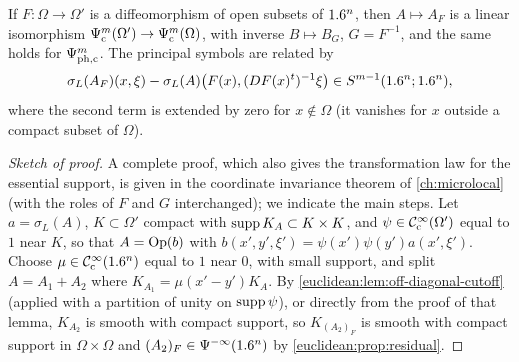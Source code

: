 \begin{proposition}\label{euclidean:prop:coordinates}
  If $F:\Omega\to\Omega'$ is a diffeomorphism of open subsets of $1.6^n$,
  then $A\mapsto A_F$ is a linear isomorphism
  $\Psi^{m}_{\mathrm c}(\Omega')\to\Psi^{m}_{\mathrm c}(\Omega)$, with inverse
  $B\mapsto B_G$, $G=F^{-1}$, and the same holds for
  $\Psi^{m}_{\mathrm{ph,c}}$. The principal symbols are related by
  \begin{equation*}
    \sigma_L(A_F)(x,\xi)-\sigma_L(A)\bigl(F(x),(DF(x)^t)^{-1}\xi\bigr)\in S^{m-1}(1.6^n;1.6^n),
  \end{equation*}
  where the second term is extended by zero for $x\notin\Omega$ \textup{(}it
  vanishes for $x$ outside a compact subset of $\Omega$\textup{)}.
\end{proposition}
\begin{proof}[Sketch of proof]
  A complete proof, which also gives the transformation law for the
  essential support, is given in the coordinate invariance theorem of
  \cref{ch:microlocal} (with the roles of $F$ and $G$ interchanged); we
  indicate the main steps. Let $a=\sigma_L(A)$, $K\subset\Omega'$ compact
  with $\operatorname{supp} K_A\subset K\times K$, and $\psi\in\mathcal{C}^\infty_{\mathrm{c}}(\Omega')$ equal to $1$
  near $K$, so that $A=\operatorname{Op}(b)$ with $b(x',y',\xi')=\psi(x')\psi(y')a(x',\xi')$.
  Choose $\mu\in\mathcal{C}^\infty_{\mathrm{c}}(1.6^n)$ equal to $1$ near $0$, with small support, and
  split $A=A_1+A_2$ where $K_{A_1}=\mu(x'-y')K_A$. By
  \cref{euclidean:lem:off-diagonal-cutoff} (applied with a partition of unity
  on $\operatorname{supp}\psi$), or directly from the proof of that lemma, $K_{A_2}$ is
  smooth with compact support, so $K_{(A_2)_F}$ is smooth with compact support
  in $\Omega\times\Omega$ and $(A_2)_F\in\Psi^{-\infty}(1.6^n)$ by
  \cref{euclidean:prop:residual}.


\end{proof}
